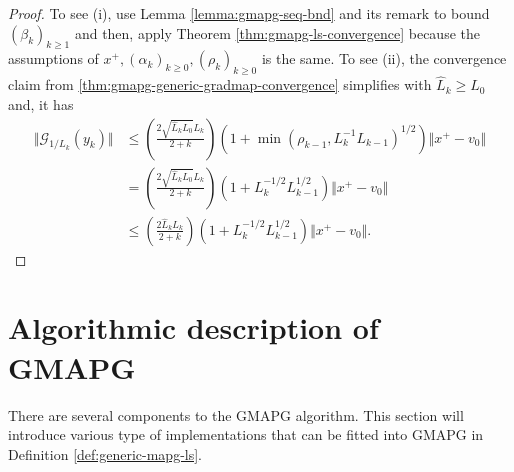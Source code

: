 \documentclass[12pt]{report}
\begin{document}
        \begin{proof}
            To see (i), use Lemma \ref{lemma:gmapg-seq-bnd} and its remark to bound $(\beta_k)_{k \ge 1}$ and then, apply Theorem \ref{thm:gmapg-ls-convergence} because the assumptions of $x^+, (\alpha_k)_{k \ge 0}, (\rho_k)_{k \ge 0}$ is the same. 
            To see (ii), the convergence claim from \ref{thm:gmapg-generic-gradmap-convergence} simplifies with $\hat L_k \ge L_0$ and, it has 
            \begin{align*}
                \Vert \mathcal G_{1/L_k}(y_k) \Vert
                &\le 
                \left(
                    \frac{2\sqrt{\hat L_kL_0}L_k}{2 + k}
                \right)\left(
                    1 + \min(\rho_{k - 1}, L_k^{-1}L_{k - 1})^{1/2}
                \right)\Vert x^+ - v_0\Vert
                \\
                &= 
                \left(
                    \frac{2\sqrt{\hat L_kL_0}L_k}{2 + k}
                \right)\left(
                    1 + L_k^{-1/2}L_{k - 1}^{1/2}
                \right)\Vert x^+ - v_0\Vert
                \\
                &\le 
                \left(
                    \frac{2\hat L_k L_k}{2 + k}
                \right)\left(
                    1 + L_k^{-1/2}L_{k - 1}^{1/2}
                \right)\Vert x^+ - v_0\Vert. 
            \end{align*}
        \end{proof}
    
    \section{Algorithmic description of GMAPG}
        There are several components to the GMAPG algorithm. 
        This section will introduce various type of implementations that can be fitted into GMAPG in Definition \ref{def:generic-mapg-ls}. 
\end{document}
